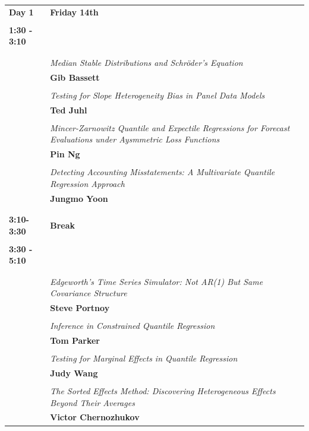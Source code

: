 \documentclass[11pt]{amsart}
\begin{document}
\begin{tabularx}{\linewidth}{l X}

\\
\large{\bf{Day 1}} & \large{\bf{Friday 14th}} \\
\\


\bf{1:30 - 3:10} & \large{\color{blue}{\bf{Session 1}}}  \\
\hline
\\
\\

& \it{Median Stable Distributions and Schr\"oder's Equation} \\
& \small{\textbf{Gib Bassett}} \\
\\
&  \it{Testing for Slope Heterogeneity Bias in Panel Data Models} \\
&  \small{\textbf{Ted Juhl}} \\
\\
& \it{Mincer-Zarnowitz Quantile and Expectile Regressions for Forecast Evaluations under Aysmmetric Loss Functions} \\
&  \small{\textbf{Pin Ng}} \\
\\
&\it{Detecting Accounting Misstatements: A Multivariate Quantile Regression Approach} \\
&  \small{\textbf{Jungmo Yoon}}
\\

\\

\\
\bf{3:10-3:30 } & \large{\bf{Break}} \\
\\

\bf{3:30 - 5:10} & \large{\color{blue}{\bf{Session 2}}}  \\
\hline
\\
\\

& \it{Edgeworth’s Time Series Simulator: Not AR(1) But Same Covariance Structure} \\
&  \small{\textbf{Steve Portnoy}} \\
\\
&  \it{Inference in Constrained Quantile Regression} \\
&  \small{\textbf{Tom Parker}} \\
\\
&  \it{Testing for Marginal Effects in Quantile Regression} \\
&  \small{\textbf{Judy Wang}} \\
\\
& \it{The Sorted Effects Method: Discovering Heterogeneous Effects Beyond Their Averages} \\
&  \small{\textbf{Victor Chernozhukov}} \\




\end{tabularx}
\end{document}
